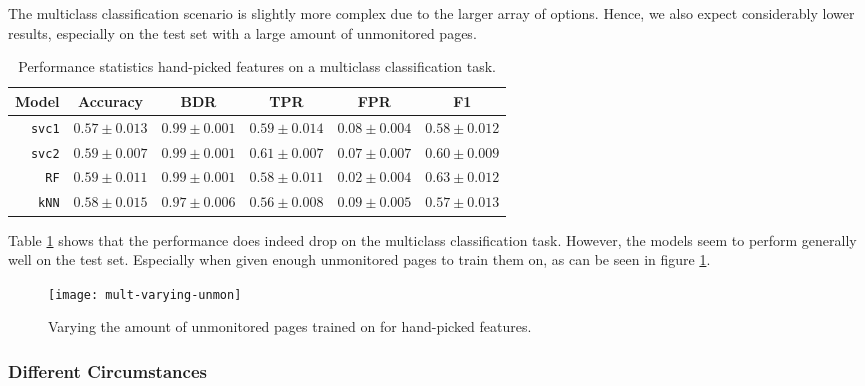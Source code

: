 The multiclass classification scenario is slightly more complex due to the larger array of options.
Hence, we also expect considerably lower results, especially on the test set with a large amount of unmonitored pages.

\begin{table}[ht]
  \centering
  \begin{tabular}{ r  r  r  r  r  r } \hline
    \multicolumn{1}{c}{\textbf{Model}} & \multicolumn{1}{c}{\textbf{Accuracy}} & \multicolumn{1}{c}{\textbf{BDR}} & \multicolumn{1}{c}{\textbf{TPR}} &
      \multicolumn{1}{c}{\textbf{FPR}} & \multicolumn{1}{c}{\textbf{F1}} \\ \hline

    \texttt{svc1} & $0.57 \pm 0.013$ & $0.99 \pm 0.001$ & $0.59 \pm 0.014$ & $0.08 \pm 0.004$ & $0.58 \pm 0.012$ \\

    \texttt{svc2} & $0.59 \pm 0.007$ & $0.99 \pm 0.001$ & $0.61 \pm 0.007$ & $0.07 \pm 0.007$ & $0.60 \pm 0.009$ \\

    \texttt{RF} & $0.59 \pm 0.011$ & $0.99 \pm 0.001$ & $0.58 \pm 0.011$ & $0.02 \pm 0.004$ & $0.63 \pm 0.012$\\

    \texttt{kNN} & $0.58 \pm 0.015$ & $0.97 \pm 0.006$ & $0.56 \pm 0.008$ & $0.09 \pm 0.005$ & $0.57 \pm 0.013$ \\

    \hline
  \end{tabular}
  \caption{Performance statistics hand-picked features on a multiclass classification task.}
  \label{table:mult-handpicked-test-error}
\end{table}

Table \ref{table:mult-handpicked-test-error} shows that the performance does indeed drop on the multiclass classification task.
However, the models seem to perform generally well on the test set.
Especially when given enough unmonitored pages to train them on, as can be seen in figure \ref{fig:mult-varying-unmon}.

\begin{figure}[ht]
  \centering
  \texttt{[image: mult-varying-unmon]}
  \caption{Varying the amount of unmonitored pages trained on for hand-picked features.}
  \label{fig:mult-varying-unmon}
\end{figure}

\subsubsection{Different Circumstances}

